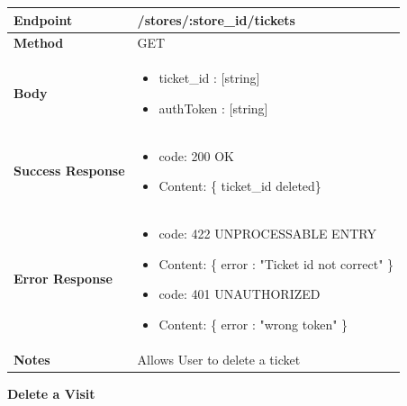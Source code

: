 \documentclass[a4paper, 12pt, oneside, table]{article}
\begin{document}
\begin{tabularx}{\linewidth}{| l | X |}
    
    \hline
     \textbf{Endpoint} & /stores/:store\_id/tickets \\
    

    \hline
    \textbf{Method}  & GET   \\
    
    \hline
    \textbf{Body}  & \parbox{0.7\textwidth}{ \begin{itemize}[label={}] 
                \item ticket\_id : [string]
                 \item authToken : [string]
               \end{itemize}}\\
    
    \hline
    \textbf{Success Response} & \parbox{0.7\textwidth}{ \begin{itemize}[label={}] 
                \item code: 200 OK
                 \item Content: \{ ticket\_id deleted\}
               \end{itemize}}\\
    
    \hline
    
    \hline
        \textbf{Error Response} & \parbox{0.7\textwidth}{ \begin{itemize}[label={}] 
                \item code: 422 UNPROCESSABLE ENTRY
                 \item Content: \{ error : "Ticket id not correct" \}
                  \item code: 401 UNAUTHORIZED
                 \item Content: \{ error : "wrong token" \}
               \end{itemize}}\\
    
    \hline
    \textbf{Notes} & Allows User to delete a ticket \\

    \hline
    
\end{tabularx}

\textbf{Delete a Visit}
\vspace{-2em}
\begin{tabularx}{0.8\textwidth} { 
  | >{\raggedright\arraybackslash}X 
  | >{\centering\arraybackslash}X 
  | >{\raggedleft\arraybackslash}X | }
 \hline

 \hline
 
\hline
\hline
 
\hline
\end{tabularx}
\end{document}
